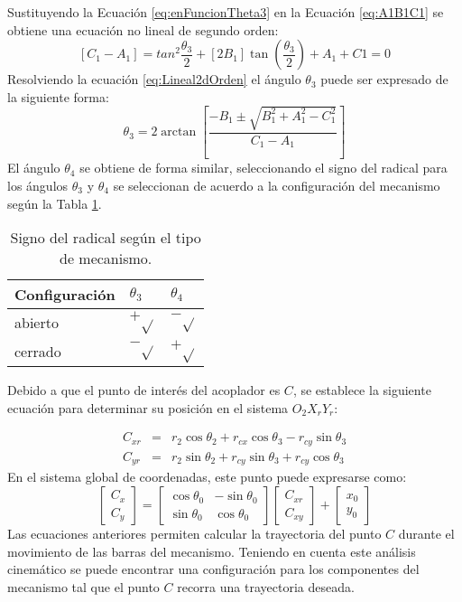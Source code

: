Sustituyendo la Ecuación \ref{eq:enFuncionTheta3} en la Ecuación \ref{eq:A1B1C1} se obtiene una ecuación no lineal de segundo orden:
\begin{equation} \label{eq:Lineal2dOrden}
 \left[C_1 -A_1\right]= tan^2{\frac{\theta_3}{2}}+\left[2B_1\right]\tan{(\frac{\theta_3}{2})}+A_1+C1=0
\end{equation}
Resolviendo la ecuación \ref{eq:Lineal2dOrden} el ángulo $\theta_3$ puede ser expresado de la siguiente forma:
\begin{equation} \label{eq:Lineal2dOrden_resuelta}
\theta_3= 2\arctan \left[ \frac{-B_1 \pm \sqrt{B^2_1+A^2_1-C^2_1}}{C_1-A_1} \right]
\end{equation}
El ángulo $\theta_4$ se obtiene de forma similar, seleccionando el signo del radical para los
ángulos $\theta_3$ y $\theta_4$ se seleccionan de acuerdo a la configuración del mecanismo según
la Tabla \ref{tab:Signo del radical}.
\begin{table}[!htbp]
\centering
\begin{tabular}{|l|l|l|}
\hline
\textbf{Configuración}& $\theta_3$& $\theta_4$  \\ \hline
abierto &  $+ \sqrt{}$&   $- \sqrt{}$  \\ \hline
cerrado & $- \sqrt{}$ & $ + \sqrt{}$  \\ \hline
\end{tabular}
\caption{Signo del radical según el tipo de mecanismo.}
\label{tab:Signo del radical}
\end{table}

Debido a que el punto de interés del acoplador es $C$, se establece la siguiente ecuación para determinar su posición en el sistema $O_2 X_r Y_r$:

\begin{eqnarray}
C_{xr}&=&r_2\cos{\theta_2} +r_{cx}\cos{\theta_3}-r_{cy}\sin{\theta_3} \label{eq:Cxr} \\
C_{yr}&=&r_2\sin{\theta_2} +r_{cy}\sin{\theta_3}+r_{cy}\cos{\theta_3}\label{eq:Cyr}
\end{eqnarray}
En el sistema global de coordenadas, este punto puede expresarse como:
\begin{equation}
 \begin{bmatrix}
  C_x\\
  C_y
\end{bmatrix}=
 \begin{bmatrix}
  \cos{\theta_0} & -\sin{\theta_0} \\
    \sin{\theta_0} & \cos{\theta_0} 
\end{bmatrix}
 \begin{bmatrix}
  C_{xr}\\
  C_{xy}
\end{bmatrix}+
 \begin{bmatrix}
  x_0\\
  y_0
\end{bmatrix}
 \end{equation}
Las ecuaciones anteriores permiten calcular la trayectoria del punto $C$ durante el movimiento de  las barras del mecanismo. Teniendo en cuenta este análisis cinemático se puede encontrar una configuración para los componentes del mecanismo tal que el punto $C$ recorra una trayectoria deseada. 

